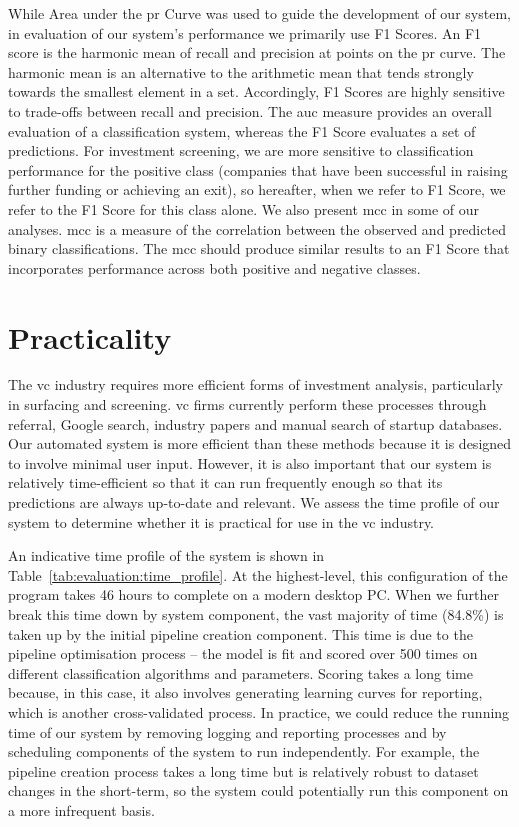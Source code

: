 \documentclass[../thesis/thesis.tex]{subfiles}
\begin{document}
While Area under the \gls{pr} Curve was used to guide the development of our system, in evaluation of our system's performance we primarily use F1 Scores. An F1 score is the harmonic mean of recall and precision at points on the \gls{pr} curve. The harmonic mean is an alternative to the arithmetic mean that tends strongly towards the smallest element in a set. Accordingly, F1 Scores are highly sensitive to trade-offs between recall and precision. The \gls{auc} measure provides an overall evaluation of a classification system, whereas the F1 Score evaluates a set of predictions. For investment screening, we are more sensitive to classification performance for the positive class (companies that have been successful in raising further funding or achieving an exit), so hereafter, when we refer to F1 Score, we refer to the F1 Score for this class alone. We also present \gls{mcc} in some of our analyses. \Gls{mcc} is a measure of the correlation between the observed and predicted binary classifications. The \gls{mcc} should produce similar results to an F1 Score that incorporates performance across both positive and negative classes.

\section{Practicality}

The \gls{vc} industry requires more efficient forms of investment analysis, particularly in surfacing and screening. \Gls{vc} firms currently perform these processes through referral, Google search, industry papers and manual search of startup databases. Our automated system is more efficient than these methods because it is designed to involve minimal user input. However, it is also important that our system is relatively time-efficient so that it can run frequently enough so that its predictions are always up-to-date and relevant. We assess the time profile of our system to determine whether it is practical for use in the \gls{vc} industry.

An indicative time profile of the system is shown in Table~\ref{tab:evaluation:time_profile}. At the highest-level, this configuration of the program takes 46 hours to complete on a modern desktop PC. When we further break this time down by system component, the vast majority of time (84.8\%) is taken up by the initial pipeline creation component. This time is due to the pipeline optimisation process -- the model is fit and scored over 500 times on different classification algorithms and parameters. Scoring takes a long time because, in this case, it also involves generating learning curves for reporting, which is another cross-validated process. In practice, we could reduce the running time of our system by removing logging and reporting processes and by scheduling components of the system to run independently. For example, the pipeline creation process takes a long time but is relatively robust to dataset changes in the short-term, so the system could potentially run this component on a more infrequent basis.
\end{document}
